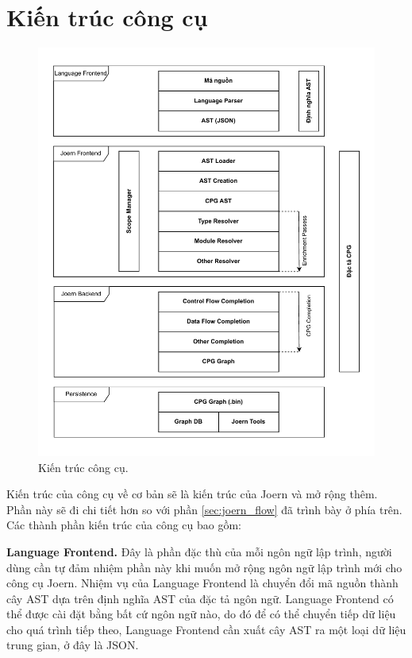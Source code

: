 \section{Kiến trúc công cụ}

\begin{figure}[H]
	\includegraphics[width=1\columnwidth]{figures/c3/c3_arch.drawio.pdf}
	\centering
	\caption{Kiến trúc công cụ.}
	\label{img:c3_arch}
\end{figure}

Kiến trúc của công cụ về cơ bản sẽ là kiến trúc của Joern và mở rộng thêm.
Phần này sẽ đi chi tiết hơn so với phần \ref{sec:joern_flow} đã trình bày ở phía trên.
Các thành phần kiến trúc của công cụ bao gồm:

\textbf{Language Frontend.} Đây là phần đặc thù của mỗi ngôn ngữ lập trình, người dùng cần tự đảm nhiệm phần này khi muốn mở rộng ngôn ngữ lập trình mới cho công cụ Joern.
Nhiệm vụ của Language Frontend là chuyển đổi mã nguồn thành cây AST dựa trên định nghĩa AST của đặc tả ngôn ngữ.
Language Frontend có thể được cài đặt bằng bất cứ ngôn ngữ nào, do đó để có thể chuyển tiếp dữ liệu cho quá trình tiếp theo, Language Frontend cần xuất cây AST ra một loại dữ liệu trung gian, ở đây là JSON.

